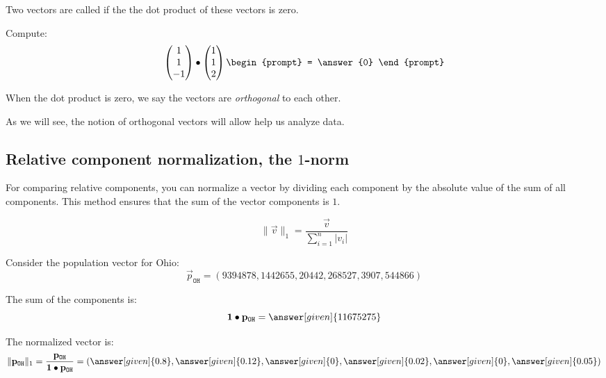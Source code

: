 \documentclass{ximera}
\begin{document}
\begin{definition}
  Two vectors are called  if the the dot product of
  these vectors is zero.
\end{definition}


\begin{question}
  Compute:
  \[
  \begin{pmatrix}1\\1\\-1\end{pmatrix}\dotp\begin{pmatrix}1\\1\\2\end{pmatrix}
  \begin{prompt}
    = \answer{0}
  \end{prompt}
  \]
\end{question}
 When the dot product is zero, we say the vectors are
 \textit{orthogonal} to each other.


As we will see, the notion of orthogonal vectors will allow help us analyze data.






\subsection{Relative component normalization, the $1$-norm}

For comparing relative components, you can normalize a vector by
dividing each component by the absolute value of the sum of all
components. This method ensures that the sum of the vector components
is $1$.

\[ \|\vec{v}\|_1 = \frac{\vec{v}}{\sum_{i=1}^n |v_i|} \]

\begin{example}
Consider the population vector for Ohio:
\[ \vec{p}_{\texttt{OH}} = (9394878, 1442655, 20442, 268527, 3907, 544866) \]

The sum of the components is:
\[
\vec{1}\dotp\vec{p}_{\texttt{OH}} = \answer[given]{11675275}
\]

The normalized vector is:
\[
\|\vec{p}_{\texttt{OH}}\|_1 =
\frac{\vec{p}_{\texttt{OH}}}{\vec{1}\dotp\vec{p}_{\texttt{OH}}} = \left(\answer[given]{0.8}, \answer[given]{0.12}, \answer[given]{0}, \answer[given]{0.02}, \answer[given]{0}, \answer[given]{0.05}\right)
\]
\end{example}
\end{document}
